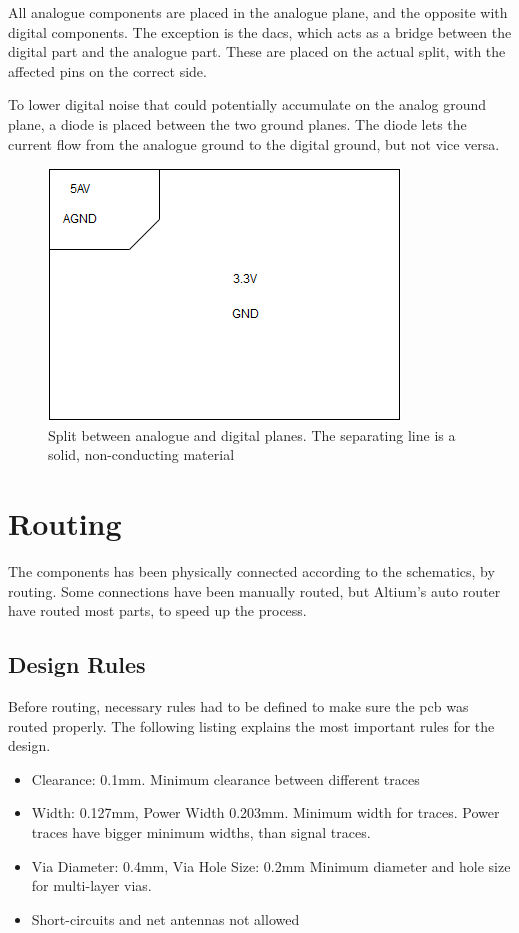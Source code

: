 All analogue components are placed in the analogue plane, and the opposite with digital components.
The exception is the \gls{dac}s, which acts as a bridge between the digital part and the analogue part.
These are placed on the actual split, with the affected pins on the correct side.

To lower digital noise that could potentially accumulate on the analog ground plane, a diode is placed between the two ground planes.
The diode lets the current flow from the analogue ground to the digital ground, but not vice versa.

\begin{figure}[h!]
\centering
\includegraphics[scale = 0.6]{images/Split_planes.png}
\caption{Split between analogue and digital planes. The separating line is a solid, non-conducting material}
\label{fig:Split planes}
\end{figure}

\section{Routing}
The components has been physically connected according to the schematics, by routing.
Some connections have been manually routed, but Altium's auto router have routed most parts, to speed up the process.

\subsection{Design Rules}
Before routing, necessary rules had to be defined to make sure the \gls{pcb} was routed properly.
The following listing explains the most important rules for the design.
\begin{itemize}
\item Clearance: 0.1mm.
\newline
Minimum clearance between different traces
\item Width: 0.127mm, Power Width 0.203mm.
\newline
Minimum width for traces.
Power traces have bigger minimum widths, than signal traces.
\item Via Diameter: 0.4mm, Via Hole Size: 0.2mm
\newline
Minimum diameter and hole size for multi-layer vias.
\item Short-circuits and net antennas not allowed
\end{itemize}

